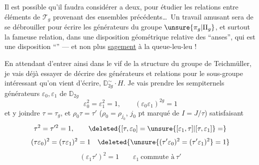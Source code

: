 



Il est possible qu'il faudra considérer   a deux, pour étudier les relations entre  éléments de $\mathcal T_g$ provenant des ensembles précédents\ldots\ Un travail amusant sera de se débrouiller pour écrire les générateurs du groupe $\unsure{\pi_g|\Pi_g}$, et surtout la fameuse relation, dans une disposition géométrique relative des ``anses'', qui est une disposition ``'' --- et non plus \uline{sagement} à la queue-leu-leu !


En attendant d'entrer ainsi dans le vif de la structure du groupe de Teichmüller, je vais déjà essayer de décrire des générateurs et relations pour le sous-groupe intéressant qu'on vient d'écrire, $\mathbb D_{2g}^{\sim}\cdot H$.
Je vais prendre les sempiternels générateurs $\varepsilon_0,\varepsilon_1$ de $\mathbb D_{2g}$
\[
\varepsilon_0^2=\varepsilon_1^2=1,\qquad (\varepsilon_0\varepsilon_1)^{2g}=1
\]
et y joindre $\tau=\tau_g$, et  $\rho_0\tau=\tau'$
($\rho_0=\rho_{j_0}$, $j_0$ pt marqué de $I=J/\tau$)
satisfaisant
\[
\tau^2=\tau'^2=1,\qquad
\deleted{[\tau,\varepsilon_0]=\unsure{[\varepsilon_1,\tau]|[\tau,\varepsilon_1]}=}
\]
\[
(\tau\varepsilon_0)^2=(\tau\varepsilon_1)^2=1\quad
\deleted{\unsure{(\tau'\varepsilon_0)^2=(\tau'\varepsilon_1)^2}=1}
\]
\[
(\varepsilon_1\tau')^2=1
\qquad \varepsilon_1\ \text{commute à}\ \tau'
\]


